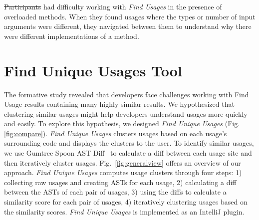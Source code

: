 \documentclass[conference]{IEEEtran}
\providecommand{\DIFadd}[1]{{\protect\color{blue}\uwave{#1}}} %
\providecommand{\DIFdel}[1]{{\protect\color{red}\sout{#1}}}                      %
\providecommand{\DIFaddbegin}{} %
\providecommand{\DIFaddend}{} %
\providecommand{\DIFdelbegin}{} %
\providecommand{\DIFdelend}{} %
\newcommand{\DIFscaledelfig}{0.5}
\newlength{\DIFdelgraphicswidth} %
\newlength{\DIFdelgraphicsheight} %
\newcommand{\DIFaddincludegraphics}[2][]{{\color{blue}\fbox{\DIFOincludegraphics[#1]{#2}}}} %
\newcommand{\DIFdelincludegraphics}[2][]{%
\sbox{\DIFdelgraphicsbox}{\DIFOincludegraphics[#1]{#2}}%
\settoboxwidth{\DIFdelgraphicswidth}{\DIFdelgraphicsbox} %
\settoboxtotalheight{\DIFdelgraphicsheight}{\DIFdelgraphicsbox} %
\scalebox{\DIFscaledelfig}{%
\parbox[b]{\DIFdelgraphicswidth}{\usebox{\DIFdelgraphicsbox}\\[-\baselineskip] \rule{\DIFdelgraphicswidth}{0em}}\llap{\resizebox{\DIFdelgraphicswidth}{\DIFdelgraphicsheight}{%
\setlength{\unitlength}{\DIFdelgraphicswidth}%
\begin{picture}(1,1)%
\thicklines\linethickness{2pt} %
{\color[rgb]{1,0,0}\put(0,0){\framebox(1,1){}}}%
{\color[rgb]{1,0,0}\put(0,0){\line( 1,1){1}}}%
{\color[rgb]{1,0,0}\put(0,1){\line(1,-1){1}}}%
\end{picture}%
}\hspace*{3pt}}} %
} %
\DeclareRobustCommand{\DIFaddbegin}{\DIFOaddbegin \let\includegraphics\DIFaddincludegraphics} %
\DeclareRobustCommand{\DIFaddend}{\DIFOaddend \let\includegraphics\DIFOincludegraphics} %
\DeclareRobustCommand{\DIFdelbegin}{\DIFOdelbegin \let\includegraphics\DIFdelincludegraphics} %
\DeclareRobustCommand{\DIFdelend}{\DIFOaddend \let\includegraphics\DIFOincludegraphics} %
\begin{document}
\DIFdelbegin \DIFdel{Participants }\DIFdelend \DIFaddbegin \DIFadd{One participant }\DIFaddend had difficulty working with \textit{Find Usages} in the presence of overloaded methods. When they found usages where the types or number of input arguments were different, they navigated between them to understand why there were different implementations of a method.



\section{Find Unique Usages Tool}
The formative study revealed that developers face challenges working with Find Usage results containing many highly similar results. We hypothesized that clustering similar usages might help developers understand usages more quickly and easily. 
To explore this hypothesis, we designed \textit{Find Unique Usages} (Fig.\ref{fig:compare}). 
\textit{Find Unique Usages} clusters usages based on each usage's surrounding code and displays the clusters to the user. To identify similar usages, we use  Gumtree Spoon AST Diff~\cite{falleri2014fine} to calculate a diff between each usage site and then iteratively cluster usages. Fig.~\ref{fig:generalview} offers an overview of our approach. \textit{Find Unique Usages} computes usage clusters through four steps: 
1) collecting raw usages and creating ASTs for each usage, 2) calculating a diff between the ASTs of each pair of usages, 3) using the diffs to calculate a similarity score for each pair of usages, 4) iteratively clustering usages based on the similarity scores. \textit{Find Unique Usages} is implemented as an IntelliJ plugin.
\end{document}
